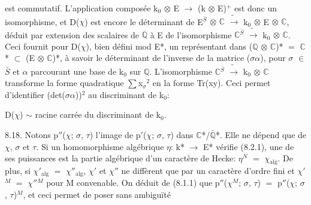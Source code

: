 \documentclass[10pt,twoside]{article}
\begin{document}
est commutatif. L’application composée k\ensuremath{_{0}} \ensuremath{⊗} E \ensuremath{→} (k \ensuremath{⊗} E)\ensuremath{^{+}} est donc un isomorphisme, et D(\ensuremath{χ}) est encore le déterminant de E\ensuremath{^{\bar{S}}} \ensuremath{⊗} \ensuremath{ℂ} \ensuremath{\widetilde{→}} k\ensuremath{_{0}} \ensuremath{⊗} E \ensuremath{⊗} \ensuremath{ℂ}, déduit par extension des scalaires de \ensuremath{ℚ} à E de l’isomorphisme \ensuremath{ℂ}\ensuremath{^{\bar{S}}} \ensuremath{\widetilde{→}} k\ensuremath{_{0}} \ensuremath{⊗} \ensuremath{ℂ}. Ceci fournit pour D(\ensuremath{χ}), bien défini mod E*, un représentant dans (\ensuremath{ℚ} \ensuremath{⊗} \ensuremath{ℂ})* \ensuremath{=} \ensuremath{ℂ}* \ensuremath{⊂} (E \ensuremath{⊗} \ensuremath{ℂ})*, à savoir le déterminant de l’inverse de la matrice (\ensuremath{σ}\ensuremath{α}), pour \ensuremath{σ} \ensuremath{∈} \ensuremath{\bar{S}} et \ensuremath{α} parcourant une base de k\ensuremath{_{0}} sur \ensuremath{ℚ}. L’isomorphisme \ensuremath{ℂ}\ensuremath{^{\bar{S}}} \ensuremath{\widetilde{→}} k\ensuremath{_{0}} \ensuremath{⊗} \ensuremath{ℂ} transforme la forme quadratique \ensuremath{∑}x\ensuremath{_{σ}}\ensuremath{^{2}} en la forme Tr(xy). Ceci permet d’identifier (det(\ensuremath{σ}\ensuremath{α}))\ensuremath{^{2}} au discriminant de k\ensuremath{_{0}}:\par
D(\ensuremath{χ}) \ensuremath{∼} racine carrée du discriminant de k\ensuremath{_{0}}.\par
8.18. Notons p\ensuremath{″}(\ensuremath{χ}; \ensuremath{σ}, \ensuremath{τ}) l’image de p\ensuremath{′}(\ensuremath{χ}; \ensuremath{σ}, \ensuremath{τ}) dans \ensuremath{ℂ}*/\ensuremath{\bar{ℚ}}*. Elle ne dépend que de \ensuremath{χ}, \ensuremath{σ} et \ensuremath{τ}. Si un homomorphisme algébrique \ensuremath{η}: k* \ensuremath{→} E* vérifie (8.2.1), une de ses puissances est la partie algébrique d’un caractère de Hecke: \ensuremath{η}\ensuremath{^{N}} \ensuremath{=} \ensuremath{χ}\ensuremath{_{\mathrm{alg}}}. De plus, si \ensuremath{χ}\ensuremath{′}\ensuremath{_{\mathrm{alg}}} \ensuremath{=} \ensuremath{χ}\ensuremath{″}\ensuremath{_{\mathrm{alg}}}, \ensuremath{χ}\ensuremath{′} et \ensuremath{χ}\ensuremath{″} ne diffèrent que par un caractère d’ordre fini et \ensuremath{χ}\ensuremath{′}\ensuremath{^{M}} \ensuremath{=} \ensuremath{χ}\ensuremath{″}\ensuremath{^{M}} pour M convenable. On déduit de (8.1.1) que p\ensuremath{″}(\ensuremath{χ}\ensuremath{^{M}}; \ensuremath{σ}, \ensuremath{τ}) \ensuremath{=} p\ensuremath{″}(\ensuremath{χ}; \ensuremath{σ}, \ensuremath{τ})\ensuremath{^{M}}, et ceci permet de poser sans ambiguïté\par
\end{document}
